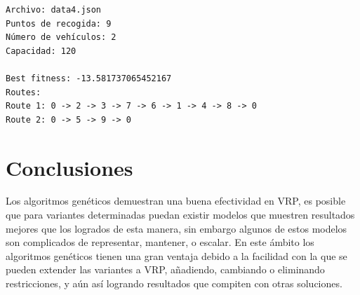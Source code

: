 \documentclass[12pt]{llncs}
\begin{document}
\begin{verbatim}
Archivo: data4.json
Puntos de recogida: 9
Número de vehículos: 2
Capacidad: 120

Best fitness: -13.581737065452167
Routes:
Route 1: 0 -> 2 -> 3 -> 7 -> 6 -> 1 -> 4 -> 8 -> 0
Route 2: 0 -> 5 -> 9 -> 0
\end{verbatim}

\section*{Conclusiones}

Los algoritmos genéticos demuestran una buena efectividad en VRP, es posible que para variantes determinadas puedan existir modelos que muestren resultados mejores que los logrados de esta manera, sin embargo algunos de estos modelos son complicados de representar, mantener, o escalar. En este ámbito los algoritmos genéticos tienen una gran ventaja debido a la facilidad con la que se pueden extender las variantes a VRP, añadiendo, cambiando o eliminando restricciones, y aún así logrando resultados que compiten con otras soluciones.

 

\end{document}
